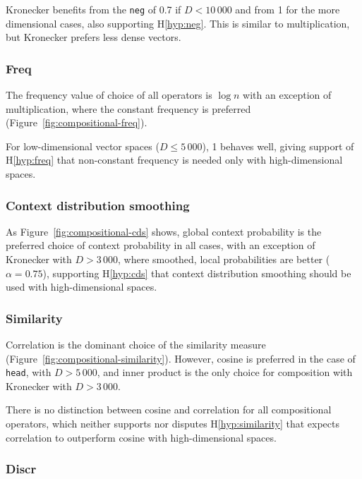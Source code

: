 Kronecker benefits from the \texttt{neg} of 0.7 if $D < 10\,000$ and from 1 for the more dimensional cases, also supporting H\ref{hyp:neg}. This is similar to multiplication, but Kronecker prefers less dense vectors.



\subsubsection{Freq}
\label{sec:freq-compositional}

The frequency value of choice of all operators is $\log n$ with an exception of multiplication, where the constant frequency is preferred (Figure~\ref{fig:compositional-freq}).

For low-dimensional vector spaces ($D \leq 5\,000$), 1 behaves well, giving support of H\ref{hyp:freq} that non-constant frequency is needed only with high-dimensional spaces.

\subsubsection{Context distribution smoothing}
\label{sec:cont-distr-smooth-compositional}

As Figure~\ref{fig:compositional-cds} shows, global context probability is the preferred choice of context probability in all cases, with an exception of Kronecker with $D > 3\,000$, where smoothed, local probabilities are better ($\alpha = 0.75$), supporting H\ref{hyp:cds} that context distribution smoothing should be used with high-dimensional spaces.

\subsubsection{Similarity}
\label{sec:similarity-compositional}

Correlation is the dominant choice of the similarity measure (Figure~\ref{fig:compositional-similarity}). However, cosine is preferred in the case of \texttt{head}, with $D > 5\,000$, and inner product is the only choice for composition with Kronecker with $D > 3\,000$.

There is no distinction between cosine and correlation for all compositional operators, which neither supports nor disputes H\ref{hyp:similarity} that expects correlation to outperform cosine with high-dimensional spaces.

\subsubsection{Discr}
\label{sec:discr-compositional}


